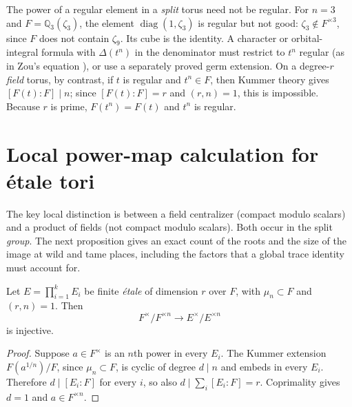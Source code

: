 \begin{remark}\label{IV:rem:power-singular}
The power of a regular element in a \emph{split} torus need not be
regular.  For $n=3$ and $F=\mathbb Q_3(\zeta_3)$, the element
$\operatorname{diag}(1,\zeta_3)$ is regular but not good:
$\zeta_3\notin F^{\times3}$, since $F$ does not contain $\zeta_9$.
Its cube is the identity.  A character or orbital-integral formula with
$\Delta(t^n)$ in the denominator must restrict to $t^n$ regular
(as in Zou's equation \cite[(3.2)]{Zo23}), or use a separately proved germ extension.
On a degree-$r$ \emph{field} torus, by contrast, if $t$ is regular
and $t^n\in F$, then Kummer theory gives
$[F(t):F]\mid n$; since $[F(t):F]=r$ and $(r,n)=1$, this is
impossible.  Because $r$ is prime, $F(t^n)=F(t)$ and $t^n$ is regular.
\end{remark}

\section{Local power-map calculation for \texorpdfstring{\'etale}{etale} tori}\label{IV:sec:localpowers}
The key local distinction is between a field centralizer (compact
modulo scalars) and a product of fields (not compact modulo scalars).
Both occur in the split \emph{group}.  The next proposition gives
an exact count of the roots and the size of the image at wild and
tame places, including the factors that a global trace identity
must account for.

\begin{lemma}\label{IV:lem:Kumprod}
Let $E=\prod_{i=1}^kE_i$ be finite \emph{\'etale} of dimension $r$
over $F$, with $\mu_n\subset F$ and $(r,n)=1$.  Then
\begin{equation}\label{IV:eq:Kummerinj}
 F^\times/F^{\times n}\longrightarrow
 E^\times/E^{\times n}
\end{equation}
is injective.
\end{lemma}
\begin{proof}
Suppose $a\in F^\times$ is an $n$th power in every $E_i$.
The Kummer extension $F(a^{1/n})/F$, since $\mu_n\subset F$,
is cyclic of degree $d\mid n$ and embeds in every $E_i$.
Therefore $d\mid[E_i:F]$ for every $i$, so also
$d\mid\sum_i[E_i:F]=r$.  Coprimality gives $d=1$ and
$a\in F^{\times n}$.
\end{proof}

